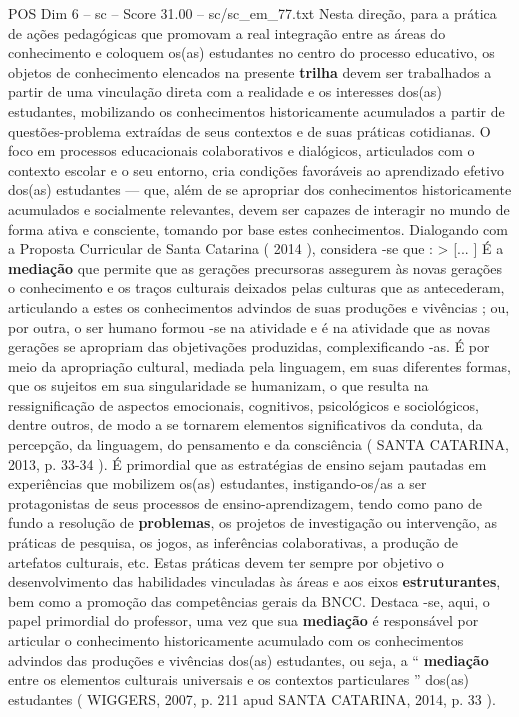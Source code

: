 \begin{textsample}{POS Dim 6 – sc – Score 31.00 – sc/sc\_em\_77.txt}
Nesta direção, para a prática de ações pedagógicas que promovam a real integração entre as áreas do conhecimento e coloquem os(as) estudantes no centro do processo educativo, os objetos de conhecimento elencados na presente \textbf{trilha} devem ser trabalhados a partir de uma vinculação direta com a realidade e os interesses dos(as) estudantes, mobilizando os conhecimentos historicamente acumulados a partir de questões-problema extraídas de seus contextos e de suas práticas cotidianas.
O foco em processos educacionais colaborativos e dialógicos, articulados com o contexto escolar e o seu entorno, cria condições favoráveis ao aprendizado efetivo dos(as) estudantes — que, além de se apropriar dos conhecimentos historicamente acumulados e socialmente relevantes, devem ser capazes de interagir no mundo de forma ativa e consciente, tomando por base estes conhecimentos.
Dialogando com a Proposta Curricular de Santa Catarina ( 2014 ), considera -se que : > [... ] É a \textbf{mediação} que permite que as gerações precursoras assegurem às novas gerações o conhecimento e os traços culturais deixados pelas culturas que as antecederam, articulando a estes os conhecimentos advindos de suas produções e vivências ; ou, por outra, o ser humano formou -se na atividade e é na atividade que as novas gerações se apropriam das objetivações produzidas, complexificando -as.
É por meio da apropriação cultural, mediada pela linguagem, em suas diferentes formas, que os sujeitos em sua singularidade se humanizam, o que resulta na ressignificação de aspectos emocionais, cognitivos, psicológicos e sociológicos, dentre outros, de modo a se tornarem elementos significativos da conduta, da percepção, da linguagem, do pensamento e da consciência ( SANTA CATARINA, 2013, p. 33-34 ).
É primordial que as estratégias de ensino sejam pautadas em experiências que mobilizem os(as) estudantes, instigando-os/as a ser protagonistas de seus processos de ensino-aprendizagem, tendo como pano de fundo a resolução de \textbf{problemas}, os projetos de investigação ou intervenção, as práticas de pesquisa, os jogos, as inferências colaborativas, a produção de artefatos culturais, etc.
Estas práticas devem ter sempre por objetivo o desenvolvimento das habilidades vinculadas às áreas e aos eixos \textbf{estruturantes}, bem como a promoção das competências gerais da BNCC.
Destaca -se, aqui, o papel primordial do professor, uma vez que sua \textbf{mediação} é responsável por articular o conhecimento historicamente acumulado com os conhecimentos advindos das produções e vivências dos(as) estudantes, ou seja, a “ \textbf{mediação} entre os elementos culturais universais e os contextos particulares ” dos(as) estudantes ( WIGGERS, 2007, p. 211 apud SANTA CATARINA, 2014, p. 33 ).

\end{textsample}
